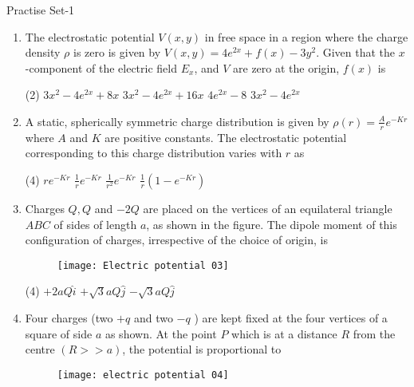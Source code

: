  
\newpage
\begin{abox}
	Practise Set-1
	\end{abox}
\begin{enumerate}[label=\color{ocre}\textbf{\arabic*.}]
	\item  The electrostatic potential $V(x, y)$ in free space in a region where the charge density $\rho$ is zero is given by $V(x, y)=4 e^{2 x}+f(x)-3 y^{2}$. Given that the $x$-component of the electric field $E_{x}$, and $V$ are zero at the origin, $f(x)$ is
	{}
	\begin{tasks}(2)
		\task[\textbf{A.}] $3 x^{2}-4 e^{2 x}+8 x$
		\task[\textbf{B.}] $3 x^{2}-4 e^{2 x}+16 x$
		\task[\textbf{C.}] $4 e^{2 x}-8$
		\task[\textbf{D.}] $3 x^{2}-4 e^{2 x}$
	\end{tasks}
	\item A static, spherically symmetric charge distribution is given by $\rho(r)=\frac{A}{r} e^{-K r}$ where $A$ and $K$ are positive constants. The electrostatic potential corresponding to this charge distribution varies with $r$ as
	{}
	\begin{tasks}(4)
		\task[\textbf{A.}] $r e^{-K r}$
		\task[\textbf{B.}] $\frac{1}{r} e^{-K r}$
		\task[\textbf{C.}] $\frac{1}{r^{2}} e^{-K r}$
		\task[\textbf{D.}] $\frac{1}{r}\left(1-e^{-K r}\right)$
	\end{tasks}
	\item Charges $Q, Q$ and $-2 Q$ are placed on the vertices of an equilateral triangle $A B C$ of sides of length $a$, as shown in the figure. The dipole moment of this configuration of charges, irrespective of the choice of origin, is
	{}
	\begin{figure}[H]
		\centering
		\texttt{[image: Electric potential 03]}
		\caption{}
		\label{}
	\end{figure}
	\begin{tasks}(4)
		\task[\textbf{A.}] $+2 a Q \hat{i}$
		\task[\textbf{B.}] $+\sqrt{3} a Q \hat{j}$
		\task[\textbf{C.}] $-\sqrt{3} a Q \hat{j}$
	\end{tasks}
	\item  Four charges (two $+q$ and two $-q$ ) are kept fixed at the four vertices of a square of side $a$ as shown. At the point $P$ which is at a distance $R$ from the centre $(R>>a)$, the potential is proportional to
	{}
	\begin{figure}[H]
		\centering
		\texttt{[image: electric potential 04]}

\end{figure}
\end{enumerate}
